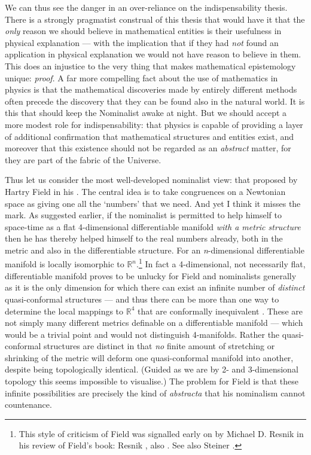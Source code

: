 \documentclass[11pt,oneside,a4paper]{article}
\begin{document}
We can thus see the danger in an over-reliance on the indispensability thesis. There is a strongly pragmatist construal of this thesis that would have it that the \textit{only} reason we should believe in mathematical entities is their usefulness in physical explanation --- with the implication that if they had \textit{not} found an application in physical explanation we would not have reason to believe in them. This does an injustice to the very thing that makes mathematical epistemology unique: \textit{proof}. A far more compelling fact about the use of mathematics in physics is that the mathematical discoveries made by entirely different methods often precede the discovery that they can be found also in the natural world. It is this that should keep the Nominalist awake at night. But we should accept a more modest role for indispensability: that physics is capable of providing a layer of additional confirmation that mathematical structures and entities exist, and moreover that this existence should not be regarded as an \textit{abstract} matter, for they are part of the fabric of the Universe.

Thus let us consider the most well-developed nominalist view: that proposed by Hartry Field in his \parencite*{field_science_1980}. The central idea is to take congruences on a Newtonian space as giving one all the `numbers' that we need. And yet I think it misses the mark. As suggested earlier, if the nominalist is permitted to help himself to space-time as a flat 4-dimensional differentiable manifold \textit{with a metric structure} then he has thereby helped himself to the real numbers already, both in the metric and also in the differentiable structure. For an \textit{n}-dimensional differentiable manifold is locally isomorphic to $\mathbb{R}^{n}$.\footnote{This style of criticism of Field was signalled early on by Michael D. Resnik in his review of Field's book: Resnik \parencite*{resnik_hartry_1983}, also \parencite{resnik_how_1985}. See also Steiner \parencite*{steiner_applicability_1998}.} In fact a 4-dimensional, not necessarily flat, differentiable manifold proves to be unlucky for Field and nominalists generally as it is the only dimension for which there can exist an infinite number of \textit{distinct} quasi-conformal structures --- and thus there can be more than one way to determine the local mappings to $\mathbb{R}^{4}$ that are conformally inequivalent \parencite{donaldson_quasiconformal_1989}. These are not simply many different metrics definable on a differentiable manifold --- which would be a trivial point and would not distinguish 4-manifolds. Rather the quasi-conformal structures are distinct in that \textit{no} finite amount of stretching or shrinking of the metric will deform one quasi-conformal manifold into another, despite being topologically identical. (Guided as we are by 2- and 3-dimensional topology this seems impossible to visualise.) The problem for Field is that these infinite possibilities are precisely the kind of \textit{abstracta} that his nominalism cannot countenance.
\end{document}

